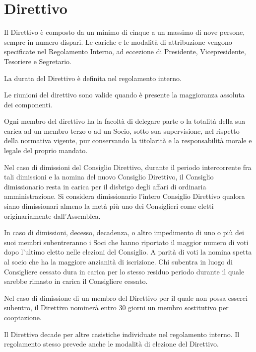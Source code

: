 \documentclass[legalpaper, 11pt]{exam}
\let\tempone\enumerate
\let\temptwo\endenumerate
\renewenvironment{enumerate}{\tempone\addtolength{\itemsep}{-0.45\baselineskip}}{\temptwo}
\begin{document}
\section{Direttivo}
\begin{enumerate}
	\item Il Direttivo è composto da un minimo di cinque a un massimo di nove persone, sempre in numero dispari. Le cariche e le modalità di attribuzione vengono specificate nel Regolamento Interno, ad eccezione di Presidente, Vicepresidente, Tesoriere e Segretario.
	\item La durata del Direttivo è definita nel regolamento interno.
	\item Le riunioni del direttivo sono valide quando è presente la maggioranza assoluta dei componenti.
	\item Ogni membro del direttivo ha la facoltà di delegare parte o la totalità della sua carica ad un membro terzo o ad un Socio, sotto sua supervisione, nel rispetto della normativa vigente, pur conservando la titolarità e la responsabilità morale e legale del proprio mandato.
	\item Nel caso di dimissioni del Consiglio Direttivo, durante il periodo intercorrente fra tali dimissioni e la nomina del nuovo Consiglio Direttivo, il Consiglio dimissionario resta in carica per il disbrigo degli affari di ordinaria amministrazione. Si considera dimissionario l’intero Consiglio Direttivo qualora siano dimissionari almeno la metà più uno dei Consiglieri come eletti originariamente dall’Assemblea.
	\item In caso di dimissioni, decesso, decadenza, o altro impedimento di uno o più dei suoi membri subentreranno i Soci che hanno riportato il maggior numero di voti dopo l’ultimo eletto nelle elezioni del Consiglio. A parità di voti la nomina spetta al socio che ha la maggiore anzianità di iscrizione. Chi subentra in luogo di Consigliere cessato dura in carica per lo stesso residuo periodo durante il quale sarebbe rimasto in carica il Consigliere cessato.
	\item Nel caso di dimissione di un membro del Direttivo per il quale non possa esserci subentro, il Direttivo nominerà entro 30 giorni un membro sostitutivo per cooptazione.
	\item Il Direttivo decade per altre casistiche individuate nel regolamento interno. Il regolamento stesso  prevede anche le modalità di elezione del Direttivo.
\end{enumerate}
\end{document}
